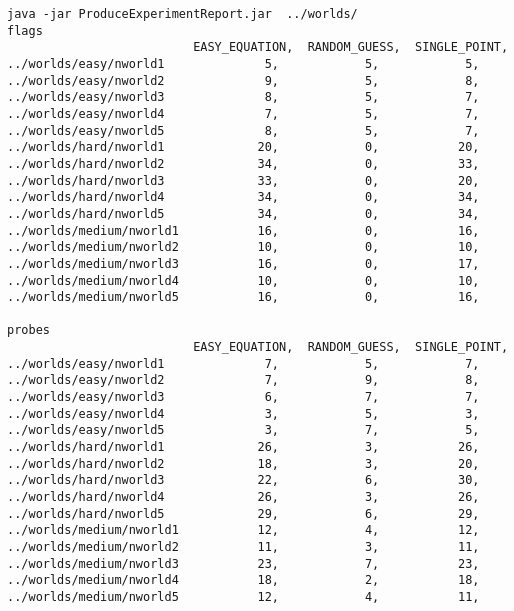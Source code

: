 \documentclass[british]{article}
\begin{document}
 \begin{lstlisting}
java -jar ProduceExperimentReport.jar  ../worlds/
flags
                          EASY_EQUATION,  RANDOM_GUESS,  SINGLE_POINT,
../worlds/easy/nworld1              5,            5,            5,
../worlds/easy/nworld2              9,            5,            8,
../worlds/easy/nworld3              8,            5,            7,
../worlds/easy/nworld4              7,            5,            7,
../worlds/easy/nworld5              8,            5,            7,
../worlds/hard/nworld1             20,            0,           20,
../worlds/hard/nworld2             34,            0,           33,
../worlds/hard/nworld3             33,            0,           20,
../worlds/hard/nworld4             34,            0,           34,
../worlds/hard/nworld5             34,            0,           34,
../worlds/medium/nworld1           16,            0,           16,
../worlds/medium/nworld2           10,            0,           10,
../worlds/medium/nworld3           16,            0,           17,
../worlds/medium/nworld4           10,            0,           10,
../worlds/medium/nworld5           16,            0,           16,

probes
                          EASY_EQUATION,  RANDOM_GUESS,  SINGLE_POINT,
../worlds/easy/nworld1              7,            5,            7,
../worlds/easy/nworld2              7,            9,            8,
../worlds/easy/nworld3              6,            7,            7,
../worlds/easy/nworld4              3,            5,            3,
../worlds/easy/nworld5              3,            7,            5,
../worlds/hard/nworld1             26,            3,           26,
../worlds/hard/nworld2             18,            3,           20,
../worlds/hard/nworld3             22,            6,           30,
../worlds/hard/nworld4             26,            3,           26,
../worlds/hard/nworld5             29,            6,           29,
../worlds/medium/nworld1           12,            4,           12,
../worlds/medium/nworld2           11,            3,           11,
../worlds/medium/nworld3           23,            7,           23,
../worlds/medium/nworld4           18,            2,           18,
../worlds/medium/nworld5           12,            4,           11,


\end{lstlisting}
\end{document}
